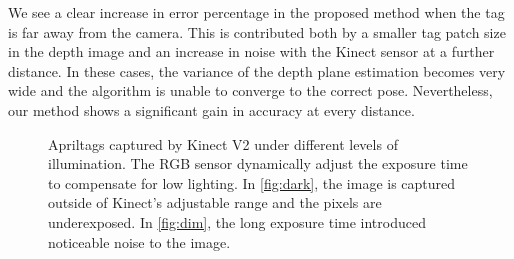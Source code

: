 We see a clear increase in error percentage in the proposed method when the tag is far away from the camera. This is contributed both by a smaller tag patch size in the depth image and an increase in noise with the Kinect sensor at a further distance. In these cases, the variance of the depth plane estimation becomes very wide and the algorithm is unable to converge to the correct pose. Nevertheless, our method shows a significant gain in accuracy at every distance.

\begin{figure}
\centering
{}
\caption{Apriltags captured by Kinect V2 under different levels of illumination. The RGB sensor dynamically adjust the exposure time to compensate for low lighting. In \ref{fig:dark}, the image is captured outside of Kinect's adjustable range and the pixels are underexposed. In \ref{fig:dim}, the long exposure time introduced noticeable noise to the image. }
\label{fig:illumination_tag}
\end{figure}

